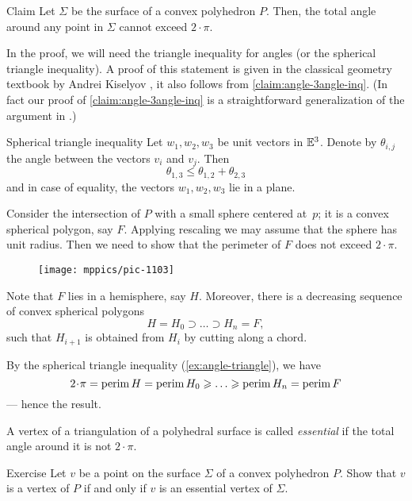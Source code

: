 \begin{thm}{Claim}\label{clm:total-angle}
Let $\Sigma$ be the surface of a convex polyhedron $P$.
Then, the total angle around any point in $\Sigma$ cannot exceed $2\cdot\pi$.
\end{thm} 

In the proof, we will need the triangle inequality for angles (or the spherical triangle inequality).
A proof of this statement is given in the classical geometry textbook by Andrei Kiselyov \cite[§ 47]{kiselev-stereo-en},
it also follows from \ref{claim:angle-3angle-inq}.
(In fact our proof of \ref{claim:angle-3angle-inq} is a straightforward generalization of the argument in \cite[§ 47]{kiselev-stereo-en}.)

\begin{thm}{Spherical triangle inequality}\label{ex:angle-triangle}
Let $w_1,w_2,w_3$ be unit vectors in $\mathbb{E}^3$.
Denote by $\theta_{i,j}$ the angle between the vectors $v_i$ and $v_j$.
Then
$$\theta_{1,3}\le \theta_{1,2}+\theta_{2,3}$$
and in case of equality, the vectors $w_1,w_2,w_3$ lie in a plane.
\end{thm}

Consider the intersection of $P$ with a small sphere centered at~$p$;
it is a convex spherical polygon, say $F$.
Applying rescaling we may assume that the sphere has unit radius.
Then we need to show that the perimeter of $F$ does not exceed $2\cdot\pi$.

\begin{wrapfigure}{o}{22mm}
\vskip-2mm
\centering
\texttt{[image: mppics/pic-1103]}
\end{wrapfigure}

Note that $F$ lies in a hemisphere, say $H$.
Moreover, there is a decreasing sequence of convex spherical polygons 
\[H=H_0\supset\dots\supset H_n=F,\]
such that $H_{i+1}$ is obtained from $H_{i}$ by cutting along a chord.

By the spherical triangle inequality (\ref{ex:angle-triangle}), we have
\[
2\cdot\pi=\perim H=\perim H_0\ge\dots\ge\perim H_n=\perim F
\]
--- hence the result.
\qedsf

A vertex of a triangulation of a polyhedral surface is called \emph{essential} if the total angle around it is not $2\cdot\pi$.

\begin{thm}{Exercise}\label{ex:vertex-essential-vertex}
Let $v$ be a point on the surface $\Sigma$ of a convex polyhedron $P$.
Show that $v$ is a vertex of $P$ if and only if 
$v$ is an essential vertex of $\Sigma$.
\end{thm}


